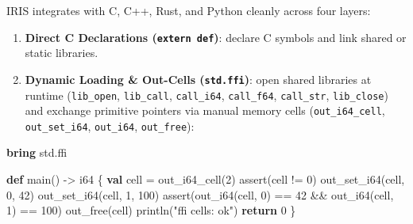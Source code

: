 \documentclass[
  english,
  oneside]{book}
\newenvironment{Shaded}{\begin{snugshade}}{\end{snugshade}}
\newcommand{\ControlFlowTok}[1]{\textcolor[rgb]{0.77,0.53,0.75}{\textbf{#1}}}
\newcommand{\DataTypeTok}[1]{\textcolor[rgb]{0.31,0.79,0.69}{#1}}
\newcommand{\DecValTok}[1]{\textcolor[rgb]{0.71,0.81,0.66}{#1}}
\newcommand{\FunctionTok}[1]{\textcolor[rgb]{0.86,0.86,0.67}{#1}}
\newcommand{\KeywordTok}[1]{\textcolor[rgb]{0.34,0.61,0.84}{\textbf{#1}}}
\newcommand{\NormalTok}[1]{\textcolor[rgb]{0.83,0.83,0.83}{#1}}
\newcommand{\OperatorTok}[1]{\textcolor[rgb]{0.83,0.83,0.83}{#1}}
\newcommand{\StringTok}[1]{\textcolor[rgb]{0.81,0.57,0.47}{#1}}
\providecommand{\tightlist}{%
  \setlength{\itemsep}{0pt}\setlength{\parskip}{0pt}}
\begin{document}
IRIS integrates with C, C++, Rust, and Python cleanly across four
layers:

\begin{enumerate}
\def\labelenumi{\arabic{enumi}.}
\tightlist
\item
  \textbf{Direct C Declarations (\texttt{extern\ def})}: declare C
  symbols and link shared or static libraries.
\item
  \textbf{Dynamic Loading \& Out-Cells (\texttt{std.ffi})}: open shared
  libraries at runtime (\texttt{lib\_open}, \texttt{lib\_call},
  \texttt{call\_i64}, \texttt{call\_f64}, \texttt{call\_str},
  \texttt{lib\_close}) and exchange primitive pointers via manual memory
  cells (\texttt{out\_i64\_cell}, \texttt{out\_set\_i64},
  \texttt{out\_i64}, \texttt{out\_free}):
\end{enumerate}

\begin{Shaded}
\begin{Highlighting}[]
\KeywordTok{bring}\NormalTok{ std}\OperatorTok{.}\NormalTok{ffi}

\KeywordTok{def}\NormalTok{ main() }\OperatorTok{{-}\textgreater{}} \DataTypeTok{i64}\NormalTok{ \{}
    \KeywordTok{val} \FunctionTok{cell} \OperatorTok{=}\NormalTok{ out\_i64\_cell(}\DecValTok{2}\NormalTok{)}
    \FunctionTok{assert}\NormalTok{(}\FunctionTok{cell} \OperatorTok{!=} \DecValTok{0}\NormalTok{)}
\NormalTok{    out\_set\_i64(}\FunctionTok{cell}\NormalTok{, }\DecValTok{0}\NormalTok{, }\DecValTok{42}\NormalTok{)}
\NormalTok{    out\_set\_i64(}\FunctionTok{cell}\NormalTok{, }\DecValTok{1}\NormalTok{, }\DecValTok{100}\NormalTok{)}
    \FunctionTok{assert}\NormalTok{(out\_i64(}\FunctionTok{cell}\NormalTok{, }\DecValTok{0}\NormalTok{) }\OperatorTok{==} \DecValTok{42} \OperatorTok{\&\&}\NormalTok{ out\_i64(}\FunctionTok{cell}\NormalTok{, }\DecValTok{1}\NormalTok{) }\OperatorTok{==} \DecValTok{100}\NormalTok{)}
\NormalTok{    out\_free(}\FunctionTok{cell}\NormalTok{)}
\NormalTok{    println(}\StringTok{"ffi cells: ok"}\NormalTok{)}
    \ControlFlowTok{return} \DecValTok{0}
\NormalTok{\}}
\end{Highlighting}
\end{Shaded}
\end{document}
